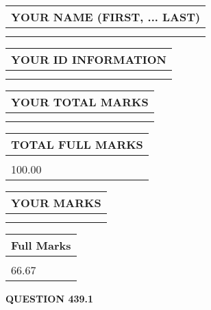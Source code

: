 \documentclass{ctexart}
\begin{document}
   
   
   
\newpage 
\setcounter{page}{ 
   439001 } 
   
   
   
   
\noindent\begin{tabular}{|l|}
\hline
YOUR NAME (FIRST, ... LAST)  \\
\hline
 \\ 
 \\ 
\hline
\end{tabular}
\hspace{0.05in} \begin{tabular}{|l|}
\hline
 YOUR   ID   INFORMATION  \\
\hline
 \\ 
 \\ 
\hline
\end{tabular}
   
   
\vspace{0.2in}\noindent\begin{tabular}{|l|}
\hline
YOUR TOTAL MARKS  \\
\hline
 \\ 
 \\ 
\hline
\end{tabular}
\hspace{0.05in} \begin{tabular}{|l|}
\hline
TOTAL FULL MARKS  \\
\hline
 \\ 
100.00 \\
\hline
\end{tabular}
   
   
 \vspace{0.2in}
 
 
 
 
   
   
  
\vspace{0.2in}
  
\noindent\begin{tabular}{|l|}
\hline
 YOUR MARKS  \\
\hline
 \\ 
 \\ 
\hline
\end{tabular}
\hspace{0.05in} \begin{tabular}{|l|}
\hline
 Full Marks  \\
\hline
 \\ 
66.67 \\
\hline
\end{tabular}
{\textbf{\Large{QUESTION
439.1 
}}}
  
\end{document}
